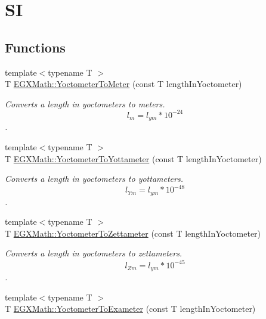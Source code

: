 \hypertarget{group___e_g_x_math-_conversions-_length_conversions-_yoctometer-_s_i}{}\section{SI}
\label{group___e_g_x_math-_conversions-_length_conversions-_yoctometer-_s_i}
\subsection*{Functions}
\begin{DoxyCompactItemize}
\item 
{\footnotesize template$<$typename T $>$ }\\T \mbox{\hyperlink{group___e_g_x_math-_conversions-_length_conversions-_yoctometer-_s_i_ga35b89591930f45660f7dcdae8660b554}{E\+G\+X\+Math\+::\+Yoctometer\+To\+Meter}} (const T length\+In\+Yoctometer)
\begin{DoxyCompactList}\small\item\em Converts a length in yoctometers to meters. \[ l_{m}=l_{ym} * 10^{-24} \]. \end{DoxyCompactList}\item 
{\footnotesize template$<$typename T $>$ }\\T \mbox{\hyperlink{group___e_g_x_math-_conversions-_length_conversions-_yoctometer-_s_i_ga6b9cdc15eb83cf15afe2a52430c84dc0}{E\+G\+X\+Math\+::\+Yoctometer\+To\+Yottameter}} (const T length\+In\+Yoctometer)
\begin{DoxyCompactList}\small\item\em Converts a length in yoctometers to yottameters. \[ l_{Ym}=l_{ym} * 10^{-48} \]. \end{DoxyCompactList}\item 
{\footnotesize template$<$typename T $>$ }\\T \mbox{\hyperlink{group___e_g_x_math-_conversions-_length_conversions-_yoctometer-_s_i_gab7fc23a884fab0c6248edee754bd6e25}{E\+G\+X\+Math\+::\+Yoctometer\+To\+Zettameter}} (const T length\+In\+Yoctometer)
\begin{DoxyCompactList}\small\item\em Converts a length in yoctometers to zettameters. \[ l_{Zm}=l_{ym} * 10^{-45} \]. \end{DoxyCompactList}\item 
{\footnotesize template$<$typename T $>$ }\\T \mbox{\hyperlink{group___e_g_x_math-_conversions-_length_conversions-_yoctometer-_s_i_ga2ffb14b252f7cc426a761de3930449a1}{E\+G\+X\+Math\+::\+Yoctometer\+To\+Exameter}} (const T length\+In\+Yoctometer)

\end{DoxyCompactItemize}
